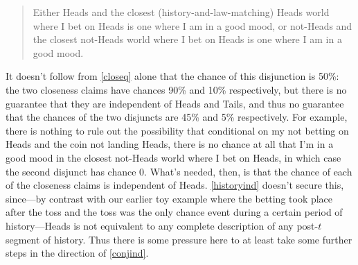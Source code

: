 \documentclass[If.tex]{subfiles}
\begin{document}
\begin{quote} 
	Either Heads and the closest (history-and-law-matching) Heads world where I bet on Heads is one where I am in a good mood, or not-Heads and the closest not-Heads world where I bet on Heads is one where I am in a good mood. 
\end{quote}
It doesn't follow from \ref{closeq} alone that the chance of this disjunction is 50\%: the two closeness claims have chances 90\% and 10\% respectively, but there is no guarantee that they are independent of Heads and Tails, and thus no guarantee that the chances of the two disjuncts are 45\% and 5\% respectively. For example, there is nothing to rule out the possibility that conditional on my not betting on Heads and the coin not landing Heads, there is no chance at all that I'm in a good mood in the closest not-Heads world where I bet on Heads, in which case the second disjunct has chance 0.  What's needed, then, is that the chance of each of the closeness claims is independent of Heads.  \ref{historyind} doesn't secure this, since---by contrast with our earlier toy example where the  betting took place after the toss and the toss was the only chance event during a certain period of history---Heads is not equivalent to any complete description of any post-$t$ segment of history.  Thus there is some pressure here to at least take some further steps in the direction of \ref{conjind}.  
\end{document}
